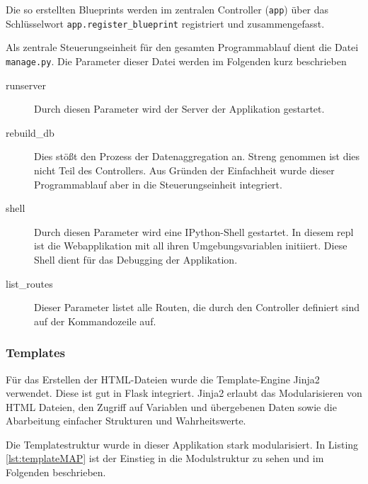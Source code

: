 Die so erstellten Blueprints werden im zentralen Controller (\texttt{app}) über das Schlüsselwort \texttt{app.register\_blueprint} registriert und zusammengefasst. 


Als zentrale Steuerungseinheit für den gesamten Programmablauf dient die Datei \texttt{manage.py}. Die Parameter dieser Datei werden im Folgenden kurz beschrieben

\begin{description}

 \item [runserver] Durch diesen Parameter wird der Server der Applikation gestartet.


 \item [rebuild\_db] Dies stößt den Prozess der Datenaggregation an.  Streng genommen ist dies nicht Teil des Controllers. Aus Gründen der Einfachheit wurde dieser Programmablauf aber in die Steuerungseinheit integriert.
 
 \item [shell] Durch diesen Parameter wird eine IPython-Shell gestartet. In diesem repl ist die Webapplikation mit all ihren Umgebungsvariablen initiiert. Diese Shell dient für das Debugging der Applikation. 
 
 \item [list\_routes] Dieser Parameter listet alle Routen, die durch den Controller definiert sind auf der Kommandozeile auf.
\end{description}


\subsubsection{Templates}

Für das Erstellen der HTML-Dateien wurde die Template-Engine Jinja2 verwendet. Diese ist gut in Flask integriert. Jinja2 erlaubt das Modularisieren von HTML Dateien, den Zugriff auf Variablen und übergebenen Daten sowie die Abarbeitung einfacher Strukturen und Wahrheitswerte. 


Die Templatestruktur wurde in dieser Applikation stark modularisiert.  In Listing \ref{lst:templateMAP} ist der Einstieg in die Modulstruktur zu sehen und im Folgenden beschrieben.

